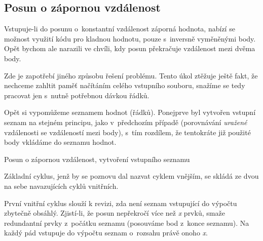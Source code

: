 \subsection{Posun o zápornou vzdálenost}
\label{zapornavzdalenost}

Vstupuje-li do posunu o~konstantní vzdálenost záporná hodnota, nabízí se možnost
využití kódu pro kladnou hodnotu, pouze s~inversně vyměněnými body. Opět bychom ale narazili
ve chvíli, kdy posun překračuje vzdálenost mezi dvěma body. 

Zde je zapotřebí jiného způsobu řešení problému. Tento úkol ztěžuje ještě fakt, že nechceme
zahltit paměť načítáním celého vstupního souboru, snažíme se tedy pracovat jen s~nutně
potřebnou dávkou řádků. 

Opět si vypomůžeme seznamem hodnot (řádků). Ponejprve byl vytvořen vstup\-ní seznam
na stejném principu, jako v~předchozím případě (porovnávání \textit{uražené} vzdálenosti se
vzdáleností mezi body), s~tím rozdílem, že tentokráte již použité body vkládáme do seznamu hodnot.

\begin{algorithm}
\label{fig:pseudozapornavzd-vstup}
\caption{Posun o zápornou vzdálenost, vytvoření vstupního seznamu}
    \begin{algorithmic}[1]
    \ENDWHILE
    \end{algorithmic}
\end{algorithm}

Základní cyklus, jenž by se poznovu dal nazvat cyklem vnějším, se skládá ze dvou na sebe
navazujících cyklů vnitřních. 

První vnitřní cyklus slouží k revizi, zda není seznam vstupující do výpočtu zbytečně obsáhlý.
Zjistí-li, že posun nepřekročí více než \textit{x} prvků, smaže redundantní prvky z~počátku seznamu (posouváme bod
z~konce seznamu). Na každý pád vstupuje do výpočtu seznam o~rozsahu právě onoho \textit{x}. 

